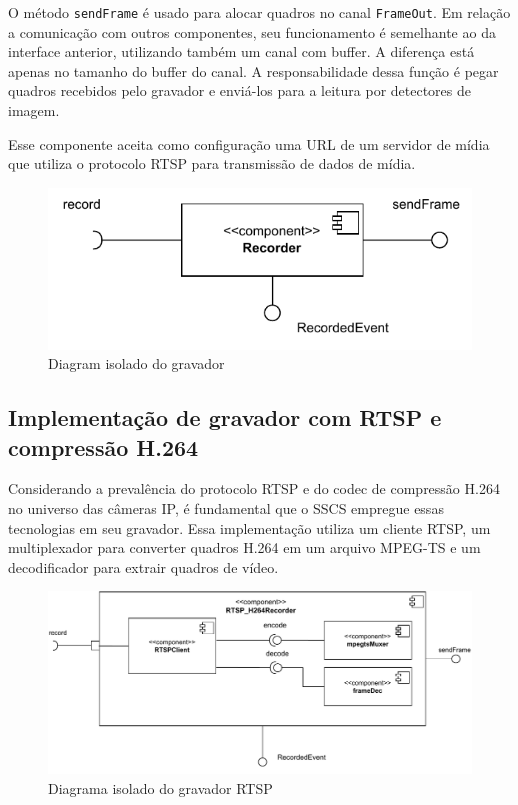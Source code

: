 \documentclass[12pt, %
openright, 
oneside, %
a4paper,    %
brazil]{facom-ufu-abntex2}
\begin{document}
O método \texttt{sendFrame} é usado para alocar quadros no canal
\texttt{FrameOut}. Em relação a comunicação com outros componentes, seu
funcionamento é semelhante ao da interface anterior, utilizando também um canal
com buffer. A diferença está apenas no tamanho do buffer do canal. A
responsabilidade dessa função é pegar quadros recebidos pelo gravador e
enviá-los para a leitura por detectores de imagem.

Esse componente aceita como configuração uma URL de um servidor de mídia que
utiliza o protocolo RTSP para transmissão de dados de mídia.

\begin{figure}[!ht]
	\centering
	\includegraphics[width=0.7\linewidth]{gravador.pdf}
	\caption[Diagram isolado do gravador]{Diagram isolado do gravador}
	\label{fig:graficosVariandoTamanhoRede}
\end{figure}

\subsection{Implementação de gravador com RTSP e compressão H.264}

Considerando a prevalência do protocolo RTSP e do codec de compressão H.264 no
universo das câmeras IP, é fundamental que o SSCS empregue essas tecnologias em
seu gravador. Essa implementação utiliza um cliente RTSP, um multiplexador para
converter quadros H.264 em um arquivo MPEG-TS e um decodificador para extrair
quadros de vídeo.

\begin{figure}[!ht]
	\centering
	\includegraphics[width=1\linewidth]{rtsp_h264recorder.pdf}
	\caption[Diagrama isolado do gravador RTSP]{Diagrama isolado do gravador RTSP}
	\label{fig:graficosVariandoTamanhoRede}
\end{figure}
\end{document}
